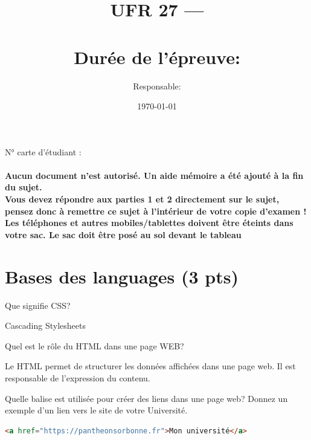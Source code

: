 \documentclass[a4paper,11pt]{exam}
\date{\today}
\title{UFR 27 --- \curiculum \\ {\courseName} \\  \normalsize{Durée de l'épreuve: \duration} }
\author{Responsable: \profname}
\date{\examDate}
\begin{document}
\maketitle

\noindent N° carte d'étudiant :  \fillin \\ \\


\noindent \textbf{Aucun document n'est autorisé. Un aide mémoire a été ajouté à la fin du sujet.\\
\noindent Vous devez répondre aux parties 1 et 2 directement sur le sujet, pensez donc à remettre ce sujet à l'intérieur de votre copie d'examen !\\
\noindent Les téléphones et autres mobiles/tablettes doivent être éteints dans votre sac. Le sac doit être posé au sol devant le tableau
}








\section{Bases des languages (3 pts)}

\begin{questions}

	\question[1] Que signifie CSS?
	\begin{solutionorlines}[3cm]
		Cascading Stylesheets
	\end{solutionorlines}

	\question[1] Quel est le rôle du HTML dans une page WEB?
	\begin{solutionorlines}[3cm]
		Le HTML permet de structurer les données affichées dans une page web. Il est responsable de l'expression du contenu.
		
	\end{solutionorlines}

	\question[1] Quelle balise est utilisée pour créer des liens dans une page web? Donnez un exemple d'un lien vers le site de votre Université.
	\begin{solutionorlines}[3cm]
		\begin{lstlisting}[frame=leftline,language={HTML},numbers=none]  
<a href="https://pantheonsorbonne.fr">Mon université</a>
		\end{lstlisting}
	\end{solutionorlines}

\end{questions}
\end{document}

